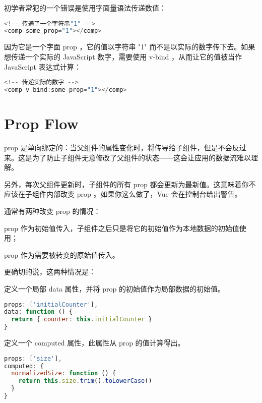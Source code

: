 初学者常犯的一个错误是使用字面量语法传递数值：

\begin{lstlisting}[language=JavaScript]
<!-- 传递了一个字符串"1" -->
<comp some-prop="1"></comp>
\end{lstlisting}


因为它是一个字面 prop ，它的值以字符串 "1" 而不是以实际的数字传下去。如果想传递一个实际的 JavaScript 数字，需要使用 v-bind ，从而让它的值被当作 JavaScript 表达式计算：



\begin{lstlisting}[language=JavaScript]
<!-- 传递实际的数字 -->
<comp v-bind:some-prop="1"></comp>
\end{lstlisting}


\section{Prop Flow}


prop 是单向绑定的：当父组件的属性变化时，将传导给子组件，但是不会反过来。这是为了防止子组件无意修改了父组件的状态——这会让应用的数据流难以理解。

另外，每次父组件更新时，子组件的所有 prop 都会更新为最新值。这意味着你不应该在子组件内部改变 prop 。如果你这么做了，Vue 会在控制台给出警告。

通常有两种改变 prop 的情况：

\begin{compactenum}
\item prop 作为初始值传入，子组件之后只是将它的初始值作为本地数据的初始值使用；
\item prop 作为需要被转变的原始值传入。
\end{compactenum}

更确切的说，这两种情况是：

\begin{compactenum}
\item 定义一个局部 data 属性，并将 prop 的初始值作为局部数据的初始值。

\begin{lstlisting}[language=JavaScript]
props: ['initialCounter'],
data: function () {
  return { counter: this.initialCounter }
}
\end{lstlisting}

\item 定义一个 computed 属性，此属性从 prop 的值计算得出。

\begin{lstlisting}[language=JavaScript]
props: ['size'],
computed: {
  normalizedSize: function () {
    return this.size.trim().toLowerCase()
  }
}
\end{lstlisting}


\end{compactenum}


